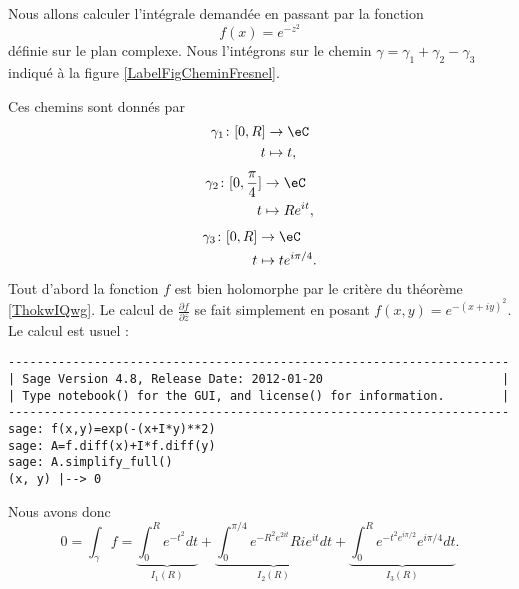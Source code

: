 Nous allons calculer l'intégrale demandée en passant par la fonction
\begin{equation}
    f(x)= e^{-z^2}
\end{equation}
définie sur le plan complexe. Nous l'intégrons sur le chemin \( \gamma=\gamma_1+\gamma_2-\gamma_3\) indiqué à la figure \ref{LabelFigCheminFresnel}.
\newcommand{\CaptionFigCheminFresnel}{Chemin d'intégration pour l'intégrale de Fresnel}

Ces chemins sont donnés par
\begin{equation}
    \begin{aligned}
        \gamma_1\colon \mathopen[ 0 , R \mathclose]&\to \eC \\
        t&\mapsto t, 
    \end{aligned}
\end{equation}
\begin{equation}
    \begin{aligned}
        \gamma_2\colon \mathopen[ 0 , \frac{ \pi }{ 4 } \mathclose]&\to \eC \\
        t&\mapsto R e^{it}, 
    \end{aligned}
\end{equation}
\begin{equation}
    \begin{aligned}
        \gamma_3\colon \mathopen[ 0 , R \mathclose]&\to \eC \\
        t&\mapsto t e^{i\pi/4}. 
    \end{aligned}
\end{equation}
Tout d'abord la fonction \( f\) est bien holomorphe par le critère du théorème \ref{ThokwIQwg}. Le calcul de \( \frac{ \partial f }{ \partial \bar z }\) se fait simplement en posant \( f(x,y)= e^{-(x+iy)^2}\). Le calcul est usuel :
\begin{verbatim}
----------------------------------------------------------------------
| Sage Version 4.8, Release Date: 2012-01-20                         |
| Type notebook() for the GUI, and license() for information.        |
----------------------------------------------------------------------
sage: f(x,y)=exp(-(x+I*y)**2)
sage: A=f.diff(x)+I*f.diff(y)
sage: A.simplify_full()
(x, y) |--> 0
\end{verbatim}
Nous avons donc
\begin{equation}    \label{EqfaoRgU}
    0=\int_{\gamma}f=\underbrace{\int_0^R e^{-t^2}dt}_{I_1(R)}+\underbrace{\int_0^{\pi/4} e^{-R^2 e^{2it}}Ri e^{it}dt}_{I_2(R)}+\underbrace{\int_0^R e^{-t^2 e^{i\pi/2}} e^{i\pi/4}dt}_{I_3(R)}.
\end{equation}

